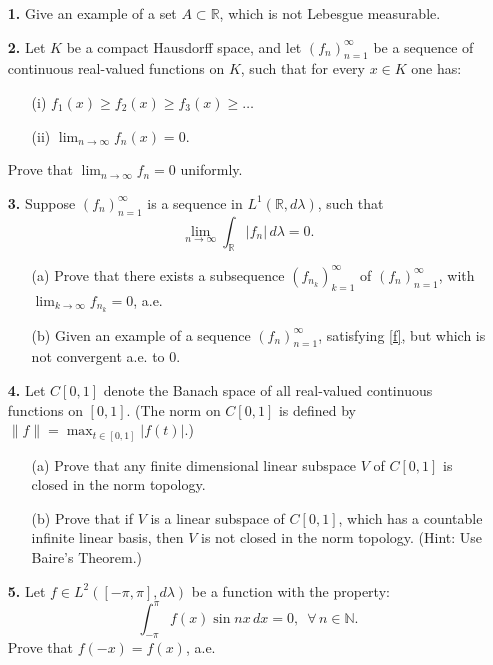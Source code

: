 \documentclass[12pt]{article}
\newcommand{\R}{\mathbb{R} }
\begin{document}
\begin{itemize}
\item[{\bf 1.}] Give an example of a set $A\subset\R$, which is not Lebesgue measurable.

\item[{\bf 2.}] Let $K$ be a compact Hausdorff space, and let
$(f_n)_{n=1}^\infty$ be a sequence of continuous real-valued functions
on $K$, such that for every $x\in K$ one has:
\begin{itemize}
\item[(i)] $f_1(x)\geq f_2(x)\geq f_3(x)\geq\dots$
\item[(ii)] $\lim_{n\to\infty}f_n(x)=0$.
\end{itemize}
Prove that $\lim_{n\to\infty }f_n=0$ uniformly.

\item[{\bf 3.}] Suppose $(f_n)_{n=1}^\infty$ is a sequence in
$L^1(\mathbb{R},d\lambda)$, such that
\begin{equation}
\lim_{n\to\infty}\int_\R |f_n|\,d\lambda=0.
\tag{$*$}
\label{f}
\end{equation}
\begin{itemize}
\item[(a)]
Prove that there exists a subsequence $(f_{n_k})_{k=1}^\infty$ of
$(f_n)_{n=1}^\infty$, with $\lim_{k\to\infty}f_{n_k}=0$, a.e.
\item[(b)] Given an example of a sequence $(f_n)_{n=1}^\infty$, satisfying
\eqref{f}, but which is not convergent a.e. to $0$.
\end{itemize}
\newpage

\item[{\bf 4.}] Let $C[0,1]$ denote the Banach space of all
real-valued continuous functions on $[0,1]$. (The norm on $C[0,1]$ is
defined by
$\displaystyle{\|f\|=\max_{t\in[0,1]}|f(t)|}$.)
\begin{itemize}
\item[(a)] Prove that any finite dimensional linear subspace $V$ of
$C[0,1]$ is closed in the norm topology.
\item[(b)] Prove that if $V$ is a linear subspace of $C[0,1]$, which
has a countable infinite linear basis, then $V$ is not closed in the
norm topology. ({\sc Hint}: Use Baire's Theorem.)
\end{itemize}

\item[{\bf 5.}]
Let $f\in L^2([-\pi,\pi],d\lambda)$ be a function with the property:
$$\int_{-\pi}^\pi f(x)\sin nx\,dx=0,\,\,\,\forall\,n\in\mathbb{N}.$$
Prove that $f(-x)=f(x)$, a.e.


\end{itemize}
\end{document}
